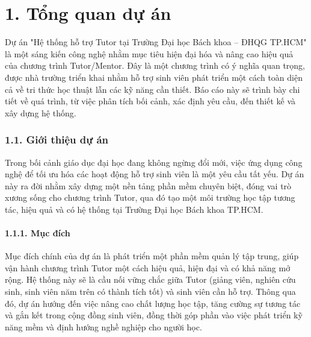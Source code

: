 \part*{1. Tổng quan dự án}
Dự án "Hệ thống hỗ trợ Tutor tại Trường Đại học Bách khoa – ĐHQG TP.HCM" là một sáng kiến công nghệ nhằm mục tiêu hiện đại hóa và nâng cao hiệu quả của chương trình Tutor/Mentor. Đây là một chương trình có ý nghĩa quan trọng, được nhà trường triển khai nhằm hỗ trợ sinh viên phát triển một cách toàn diện cả về tri thức học thuật lẫn các kỹ năng cần thiết. Báo cáo này sẽ trình bày chi tiết về quá trình, từ việc phân tích bối cảnh, xác định yêu cầu, đến thiết kế và xây dựng hệ thống.


\section*{1.1. Giới thiệu dự án}
Trong bối cảnh giáo dục đại học đang không ngừng đổi mới, việc ứng dụng công nghệ để tối ưu hóa các hoạt động hỗ trợ sinh viên là một yêu cầu tất yếu. Dự án này ra đời nhằm xây dựng một nền tảng phần mềm chuyên biệt, đóng vai trò xương sống cho chương trình Tutor, qua đó tạo một môi trường học tập tương tác, hiệu quả và có hệ thống tại Trường Đại học Bách khoa TP.HCM.


\subsection*{1.1.1. Mục đích}

Mục đích chính của dự án là phát triển một phần mềm quản lý tập trung, giúp vận hành chương trình Tutor một cách hiệu quả, hiện đại và có khả năng mở rộng. Hệ thống này sẽ là cầu nối vững chắc giữa Tutor (giảng viên, nghiên cứu sinh, sinh viên năm trên có thành tích tốt) và sinh viên cần hỗ trợ. Thông qua đó, dự án hướng đến việc nâng cao chất lượng học tập, tăng cường sự tương tác và gắn kết trong cộng đồng sinh viên, đồng thời góp phần vào việc phát triển kỹ năng mềm và định hướng nghề nghiệp cho người học.


